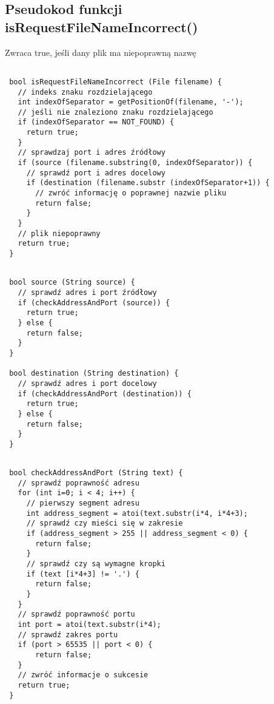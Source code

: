 \documentclass[a4paper,11pt]{report}
\begin{document}
\subsection{Pseudokod funkcji isRequestFileNameIncorrect()}

Zwraca true, jeśli dany plik ma niepoprawną nazwę

\begin{lstlisting}

 bool isRequestFileNameIncorrect (File filename) {
   // indeks znaku rozdzielającego
   int indexOfSeparator = getPositionOf(filename, '-');
   // jeśli nie znaleziono znaku rozdzielającego
   if (indexOfSeparator == NOT_FOUND) {
     return true;
   }
   // sprawdzaj port i adres źródłowy
   if (source (filename.substring(0, indexOfSeparator)) {
     // sprawdź port i adres docelowy
     if (destination (filename.substr (indexOfSeparator+1)) {
       // zwróć informację o poprawnej nazwie pliku
       return false;
     }
   }
   // plik niepoprawny
   return true;
 }

\end{lstlisting}

\begin{lstlisting}

 bool source (String source) {
   // sprawdź adres i port źródłowy
   if (checkAddressAndPort (source)) {
     return true;
   } else {
     return false;
   }
 }
 
 bool destination (String destination) {
   // sprawdź adres i port docelowy
   if (checkAddressAndPort (destination)) {
     return true;
   } else {
     return false;
   }
 }
\end{lstlisting}

\begin{lstlisting}

 bool checkAddressAndPort (String text) {  
   // sprawdź poprawność adresu
   for (int i=0; i < 4; i++) {
     // pierwszy segment adresu
     int address_segment = atoi(text.substr(i*4, i*4+3);
     // sprawdź czy mieści się w zakresie
     if (address_segment > 255 || address_segment < 0) {
       return false;
     }
     // sprawdź czy są wymagne kropki
     if (text [i*4+3] != '.') {
       return false;
     } 
   }
   // sprawdź poprawność portu
   int port = atoi(text.substr(i*4);
   // sprawdź zakres portu
   if (port > 65535 || port < 0) {
       return false;
   }
   // zwróć informacje o sukcesie
   return true;
 }

\end{lstlisting}
\end{document}
